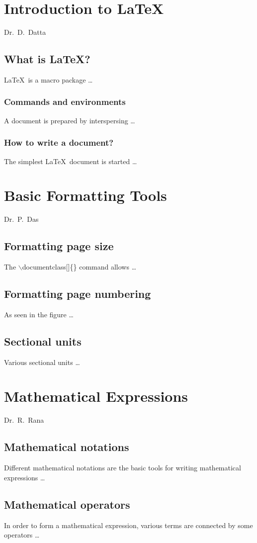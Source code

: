 \documentclass[a4paper,openany]{book}
\begin{document}
\dominitoc
\tableofcontents
 \faketableofcontents
%
\chapter[Introduction to \LaTeX\\{\it Dr.\ D.\ Datta}]{Introduction to \LaTeX}
\begin{flushright} Dr.\ D.\ Datta \end{flushright}
\minitoc
\section{What is \LaTeX?}
\LaTeX\ is a macro package …
\subsection{Commands and environments}
A document is prepared by interspersing …
\subsection{How to write a document?}
The simplest \LaTeX\ document is started …
%
\chapter[Basic Formatting Tools\\{\it Dr.\ P.\ Das}]{Basic Formatting Tools}
\begin{flushright} Dr.\ P.\ Das \end{flushright}
\minitoc
\section{Formatting page size}
The $\backslash$documentclass[]\{\} command allows …
\section{Formatting page numbering}
As seen in the figure …
\section{Sectional units}
Various sectional units …
%
\chapter[Mathematical Expressions\\{\it Dr.\ R.\ Rana}]{Mathematical Expressions}
\begin{flushright} Dr.\ R.\ Rana \end{flushright}
\minitoc
\section{Mathematical notations}
Different mathematical notations are the basic tools for writing mathematical expressions …
\section{Mathematical operators}
In order to form a mathematical expression, various terms are connected by some operators …
\end{document}
